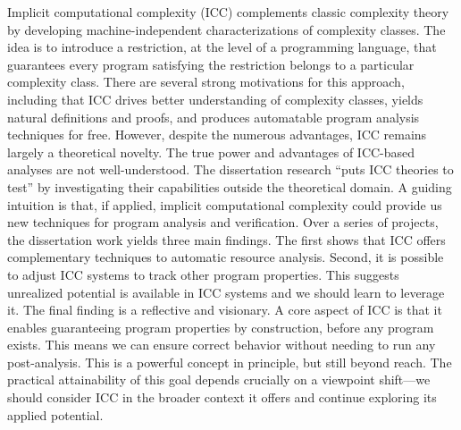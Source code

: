 Implicit computational complexity (ICC) complements classic complexity theory by developing machine-independent characterizations of complexity classes. The idea is to introduce a restriction, at the level of a programming language, that guarantees every program satisfying the restriction belongs to a particular complexity class. There are several strong motivations for this approach, including that ICC drives better understanding of complexity classes, yields natural definitions and proofs, and produces automatable program analysis techniques for free. However, despite the numerous advantages, ICC remains largely a theoretical novelty. The true power and advantages of ICC-based analyses are not well-understood. The dissertation research ``puts ICC theories to test'' by investigating their capabilities outside the theoretical domain. A guiding intuition is that, if applied, implicit computational complexity could provide us new techniques for program analysis and verification. Over a series of projects, the dissertation work yields three main findings. The first shows that ICC offers complementary techniques to automatic resource analysis. Second, it is possible to adjust ICC systems to track other program properties. This suggests unrealized potential is available in ICC systems and we should learn to leverage it. The final finding is a reflective and visionary. A core aspect of ICC is that it enables guaranteeing program properties by construction, before any program exists. This means we can ensure correct behavior without needing to run any post-analysis. This is a powerful concept in principle, but still beyond reach. The practical attainability of this goal depends crucially on a viewpoint shift---we should consider ICC in the broader context it offers and continue exploring its applied potential.

